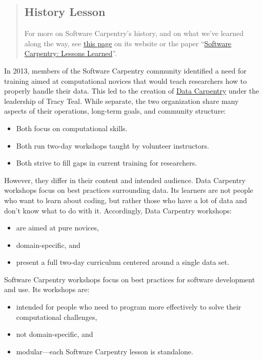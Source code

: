 \begin{quotation}   %
\subsection*{History Lesson}

For more on Software Carpentry's history,
and on what we've learned along the way,
see \href{\{\{ site.swc\_site \}\}/scf/history/}{this page} on its website
or the paper ``\href{http://f1000research.com/articles/3-62/v2}{Software Carpentry: Lessons Learned}''.
\end{quotation}   %

In 2013, members of the Software Carpentry community identified a need
for training aimed at computational novices that would teach
researchers how to properly handle their data.  This led to the
creation of \href{\{\{ site.dc\_site \}\}}{Data Carpentry} under the leadership of Tracy Teal.
While separate, the two organization share many aspects of their operations,
long-term goals, and community structure:

\begin{itemize}
\item Both focus on computational skills.
\item Both run two-day workshops taught by volunteer instructors.
\item Both strive to fill gaps in current training for researchers.
\end{itemize}

However, they differ in their content and intended audience.
Data Carpentry workshops focus on best practices surrounding data.
Its learners are not people who want to learn about coding,
but rather those who have a lot of data and don't know what to do with it.
Accordingly, Data Carpentry workshops:

\begin{itemize}
\item are aimed at pure novices,
\item domain-specific, and
\item present a full two-day curriculum centered around a single data set.
\end{itemize}

Software Carpentry workshops focus on best practices for software development and use.
Its workshops are:

\begin{itemize}
\item intended for people who need to program more effectively to solve their
computational challenges,
\item not domain-specific, and
\item modular---each Software Carpentry lesson is standalone.
\end{itemize}

